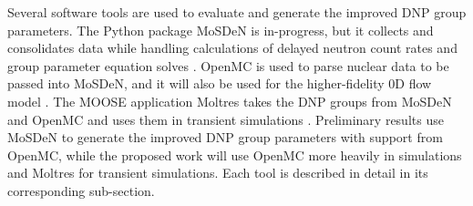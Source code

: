 
Several software tools are used to evaluate and generate the improved \gls{DNP} group parameters.
The Python package \gls{MoSDeN} is in-progress, but it collects and consolidates data while handling calculations of delayed neutron count rates and group parameter equation solves \cite{python}.
OpenMC is used to parse nuclear data to be passed into \gls{MoSDeN}, and it will also be used for the higher-fidelity 0D flow model \cite{romano_openmc_2015}.
The \gls{MOOSE} application Moltres takes the \gls{DNP} groups from \gls{MoSDeN} and OpenMC and uses them in transient simulations \cite{lindsay_introduction_2018}.
Preliminary results use \gls{MoSDeN} to generate the improved \gls{DNP} group parameters with support from OpenMC, while the proposed work will use OpenMC more heavily in simulations and Moltres for transient simulations.
Each tool is described in detail in its corresponding sub-section.